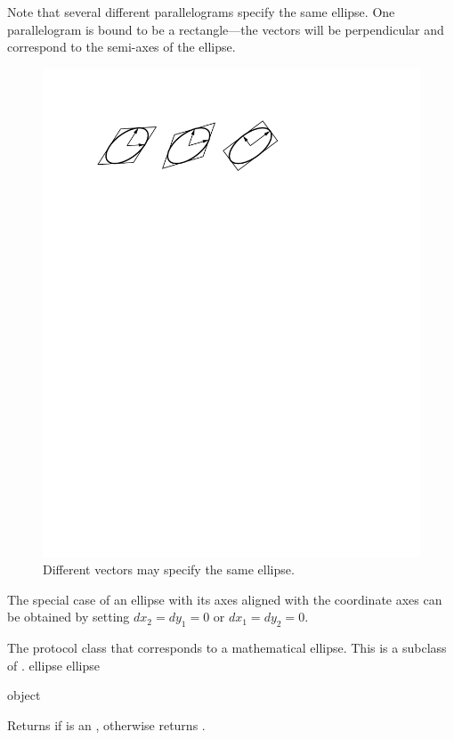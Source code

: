 Note that several different parallelograms specify the same ellipse.  One
parallelogram is bound to be a rectangle---the vectors will be perpendicular
and correspond to the semi-axes of the ellipse.

\begin{figure}
\centerline{\includegraphics{different-ellipses}}
\caption{Different vectors may specify the same ellipse.}
\end{figure}

The special case of an ellipse with its axes aligned with the coordinate axes
can be obtained by setting $dx_2 = dy_1 = 0$ or $dx_1 = dy_2 = 0$.



The protocol class that corresponds to a mathematical ellipse.  This is a
subclass of .
 {ellipse} {ellipse}

 {object}

Returns  if  is an , otherwise returns
.

